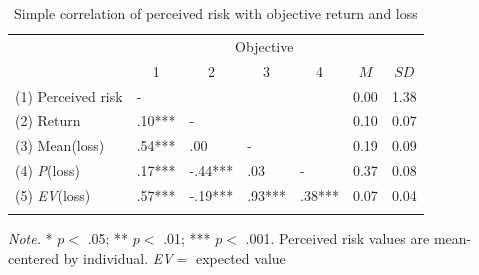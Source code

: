 \documentclass[a4paper,man, natbib,floatsintext]{apa6} %
\begin{document}
\begin{table}[tbp]
\begin{center}                     
\begin{threeparttable}                         
\caption{Simple correlation of perceived risk with objective return and loss}
\label{tab:cor_risk_loss}

                                                                                     
\begin{tabular}{lllllll}
\toprule                                                                             
 & & \multicolumn{3}{c}{Objective}  &\\                                                
\cmidrule(r){3-5}                                                                    
 & \multicolumn{1}{c}{1} & \multicolumn{1}{c}{2} & \multicolumn{1}{c}{3} & \multicolumn{1}{c}{4} & \multicolumn{1}{c}{$M$} & \multicolumn{1}{c}{$SD$}\\                   
\midrule                                                                             
(1) Perceived risk & - &  &  &  & 0.00 & 1.38\\                                      
(2) Return & .10*** & - &  &  & 0.10 & 0.07\\                                        
(3) Mean(loss) & .54*** & .00 & - &  & 0.19 & 0.09\\                                 
(4) \textit{P}(loss) & .17*** & -.44*** & .03 & - & 0.37 & 0.08\\                             
(5) \textit{EV}(loss) & .57*** & -.19*** & .93*** & .38*** & 0.07 & 0.04\\             
\bottomrule                                                                          
\addlinespace                                                                        
\end{tabular}                                                                        
                                                                                     
\begin{tablenotes}[para]                                                             
\normalsize{\textit{Note.} * $p <$  .05; ** $p < $ .01; *** $p < $ .001. Perceived risk values are mean-centered by individual. \textit{EV}$=$ expected value}                                                                          
\end{tablenotes}                                                                     
                                                                                     
\end{threeparttable}                                                                 
\end{center}                                                                         
                                                                                     
\end{table}
\end{document}
